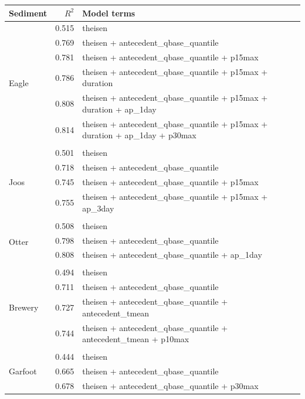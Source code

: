 \documentclass[10pt]{article}
\begin{document}
\begin{table}[h] \small
    \begin{center}
    \begin{tabular}{lrl}
    \textbf{Sediment} & $R^2$ & Model terms \\
    \hline
\multirow{7}{*}{Eagle} & 0.515 & theisen\\ 
 & 0.769 & theisen + antecedent\_qbase\_quantile\\ 
 & 0.781 & theisen + antecedent\_qbase\_quantile + p15max\\ 
 & 0.786 & theisen + antecedent\_qbase\_quantile + p15max + duration\\ 
 & 0.808 & theisen + antecedent\_qbase\_quantile + p15max + duration + ap\_1day\\ 
 & 0.814 & theisen + antecedent\_qbase\_quantile + p15max + duration + ap\_1day + p30max\\ 
\vspace{2mm}\\ \multirow{5}{*}{Joos} & 0.501 & theisen\\ 
 & 0.718 & theisen + antecedent\_qbase\_quantile\\ 
 & 0.745 & theisen + antecedent\_qbase\_quantile + p15max\\ 
 & 0.755 & theisen + antecedent\_qbase\_quantile + p15max + ap\_3day\\ 
\vspace{2mm}\\ \multirow{4}{*}{Otter} & 0.508 & theisen\\ 
 & 0.798 & theisen + antecedent\_qbase\_quantile\\ 
 & 0.808 & theisen + antecedent\_qbase\_quantile + ap\_1day\\ 
\vspace{2mm}\\ \multirow{5}{*}{Brewery} & 0.494 & theisen\\ 
 & 0.711 & theisen + antecedent\_qbase\_quantile\\ 
 & 0.727 & theisen + antecedent\_qbase\_quantile + antecedent\_tmean\\ 
 & 0.744 & theisen + antecedent\_qbase\_quantile + antecedent\_tmean + p10max\\ 
\vspace{2mm}\\ \multirow{5}{*}{Garfoot} & 0.444 & theisen\\ 
 & 0.665 & theisen + antecedent\_qbase\_quantile\\ 
 & 0.678 & theisen + antecedent\_qbase\_quantile + p30max\\ 

\end{tabular}
\end{center}
\end{table}
\end{document}
